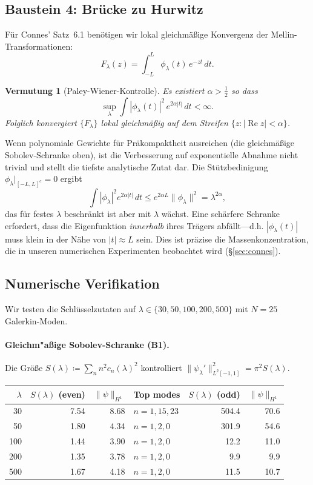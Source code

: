 ﻿\documentclass[12pt,a4paper]{article}
\newtheorem{conjecture}[theorem]{Vermutung}
\theoremstyle{definition}
\theoremstyle{remark}
\begin{document}
\subsection{Baustein 4: Br\"ucke zu Hurwitz}

Für Connes' Satz~6.1 benötigen wir lokal gleichmäßige Konvergenz der Mellin-Transformationen:
\[
  F_\lambda(z) = \int_{-L}^{L} \phi_\lambda(t)\,e^{-zt}\,dt.
\]

\begin{conjecture}[Paley-Wiener-Kontrolle]
\label{conj:pw}
Es existiert $\alpha > \tfrac{1}{2}$ so dass
\[
  \sup_\lambda \int |\phi_\lambda(t)|^2\,e^{2\alpha|t|}\,dt < \infty.
\]
Folglich konvergiert $\{F_\lambda\}$ lokal gleichmäßig auf dem Streifen
$\{z : |\operatorname{Re} z| < \alpha\}$.
\end{conjecture}

Wenn polynomiale Gewichte für Präkompaktheit ausreichen (die gleichmäßige Sobolev-Schranke oben), ist die Verbesserung auf exponentielle Abnahme nicht trivial und stellt die tiefste analytische Zutat dar. Die Stützbedinigung $\phi_\lambda|_{[-L,L]^c} = 0$ ergibt
\[
  \int |\phi_\lambda|^2 e^{2\alpha|t|}\,dt \leq e^{2\alpha L}\|\phi_\lambda\|^2 = \lambda^{2\alpha},
\]
das für festes $\lambda$ beschränkt ist aber mit $\lambda$ wächst. Eine schärfere Schranke erfordert, dass die Eigenfunktion \emph{innerhalb} ihres Trägers abfällt---d.h. $|\phi_\lambda(t)|$ muss klein in der Nähe von $|t| \approx L$ sein. Dies ist präzise die Massenkonzentration, die in unseren numerischen Experimenten beobachtet wird (\S\ref{sec:connes}).

\subsection{Numerische Verifikation}
\label{sec:wc-numerics}

Wir testen die Schlüsselzutaten auf $\lambda \in \{30, 50, 100, 200, 500\}$ mit $N = 25$ Galerkin-Moden.

\paragraph{Gleichm"a\ss ige Sobolev-Schranke (B1).}
Die Größe $S(\lambda) \coloneqq \sum_{n} n^2 c_n(\lambda)^2$ kontrolliert $\|\psi_\lambda'\|_{L^2[-1,1]}^2 = \pi^2 S(\lambda)$.

\begin{center}
\small
\renewcommand{\arraystretch}{1.15}
\begin{tabular}{r|r|r|l||r|r}
$\lambda$ & $S(\lambda)$ (even) & $\|\psi\|_{H^1}$ & Top modes & $S(\lambda)$ (odd) & $\|\psi\|_{H^1}$ \\\hline
30  & 7.54  & 8.68  & $n = 1,15,23$ & 504.4  & 70.6 \\
50  & 1.80  & 4.34  & $n = 1,2,0$   & 301.9  & 54.6 \\
100 & 1.44  & 3.90  & $n = 1,2,0$   & 12.2   & 11.0 \\
200 & 1.35  & 3.78  & $n = 1,2,0$   & 9.9    & 9.9  \\
500 & 1.67  & 4.18  & $n = 1,2,0$   & 11.5   & 10.7
\end{tabular}
\end{center}
\end{document}
